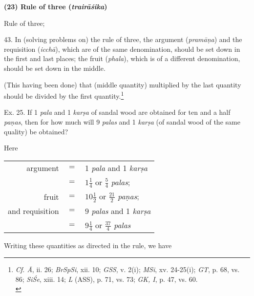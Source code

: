 \documentclass[10pt, openany]{book}
\begin{document}
{{{{{{{{{{{{{{{{{{{{\begin{sloppypar}
\begin{center} \textbf{(23) Rule of three (\textit{trairāśika})}
\end{center}

\noindent Rule of three;
\vspace{3mm}

 43. In (solving problems on) the rule of three, the
argument (\textit{pramāṇa}) and the requisition (\textit{icchā}), which are
of the same denomination, should be set down in the first and
last places; the fruit (\textit{phala}), which is of a different denomination, should be set down in the middle.


\newpage

\noindent (This having been done) that (middle quantity) multiplied by the last
quantity should be divided by the first quantity.\renewcommand{\thefootnote}{1}\footnote{\hspace{-2mm} \en \textit{Cf. Ā}, ii. 26;  \textit{BrSpSi}, xii. 10;  \textit{GSS}, v. 2(i);  \textit{MSi}, xv.
24-25(i);  \textit{GT}, p. 68, vs. 86; \textit{SiŚe}, xiii. 14;  \textit{L} (ASS), p.
71, vs. 73;  \textit{GK, I},
p. 47, vs. 60.\\}
\vspace{3mm}

 Ex. 25. If 1  \textit{pala} and 1  \textit{karṣa} of sandal wood are obtained for ten and a half  \textit{paṇas}, then for how much will
9  \textit{palas} and 1  \textit{karṣa} (of sandal wood of the same quality)
be obtained?
\vspace{3mm}

{\small Here
\vspace{1mm}

\renewcommand*{\arraystretch}{1.4}
\hspace{10mm} \begin{tabular}{rcl} 
argument & $=$ & 1  \textit{pala} and 1  \textit{karṣa}\\
 & $=$ & $1 \frac{1}{4}$ or $\frac{5}{4}$  \textit{palas};\\
fruit & $=$ & $10 \frac{1}{2}$ or $\frac{21}{2}$  \textit{paṇas};\\
 and requisition & $=$ & $9$ \textit{palas} and 1  \textit{karṣa}\\
 & $=$ & $9 \frac{1}{4}$ or $\frac{37}{4}$  \textit{palas} \end{tabular}
\vspace{3mm}

 Writing these quantities as directed in the rule, we have
\vspace{3mm}

}
\end{sloppypar}}}}}}}}}}}}}}}}}}}}}
\end{document}
